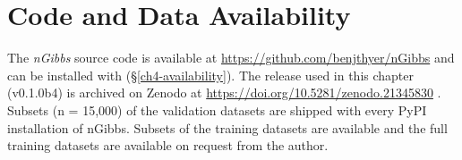 \section*{Code and Data Availability}\label{ch4-code-availability}

The \emph{nGibbs} source code is available at \url{https://github.com/benjthyer/nGibbs} and can be installed
with  (\S\ref{ch4-availability}).
The release used in this chapter (v0.1.0b4) is archived on Zenodo at \url{https://doi.org/10.5281/zenodo.21345830} \citep{thyer2026ngibbs}.
Subsets (n = 15,000) of the validation datasets are shipped with every PyPI installation of nGibbs. 
Subsets of the training datasets are available  and the full training datasets are available on request from the author. 